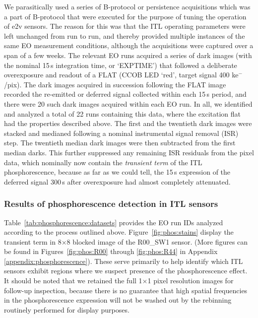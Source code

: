 We parasitically used a series of B-protocol or persistence acquisitions which was a part of B-protocol that were executed for the purpose of tuning the operation of e2v sensors. The reason for this was that the ITL operating parameters were left unchanged from run to run, and thereby provided multiple instances of the same EO measurement conditions, although the acquisitions were captured over a span of a few weeks. The relevant EO runs acquired a series of dark images (with the nominal 15\,s integration time, or `EXPTIME') that followed a deliberate overexposure and readout of a FLAT (CCOB LED `red', target signal 400 ke$^-$/pix). The dark images acquired in succession following the FLAT image recorded the re-emitted or deferred signal collected within each 15\,s period, and there were 20 such dark images acquired within each EO run. In all, we identified and analyzed a total of 22 runs containing this data, where the excitation flat had the properties described above. The first and the twentieth dark images were stacked and medianed following a nominal instrumental signal removal (ISR) step. The twentieth median dark images were then subtracted from the first median darks. This further suppressed any remaining ISR residuals from the pixel data, which nominally now contain the {\it transient term} of the ITL phosphorescence, because as far as we could tell, the 15\,s expression of the deferred signal 300\,s after overexposure had almost completely attenuated.

\subsubsection{Results of phosphorescence detection in ITL sensors}\label{phos-results}

Table~\ref{tab:phosphorescence:datasets} provides the EO run IDs analyzed according to the process outlined above. Figure~\ref{fig:phos:stains} display the transient term in 8$\times$8 blocked image of the R00\_SW1 sensor. (More figures can be found in  Figures~\ref{fig:phos:R00} through \ref{fig:phos:R44} in Appendix \ref{appendix:phosphorescence}). These serve primarily to help identify which ITL sensors exhibit regions where we suspect presence of the phosphorescence effect. It should be noted that we retained the full 
1$\times$1 
pixel resolution images for follow-up inspection, because there is no guarantee that high spatial frequencies in the phosphorescence expression will not be washed out by the rebinning routinely performed for display purposes.

